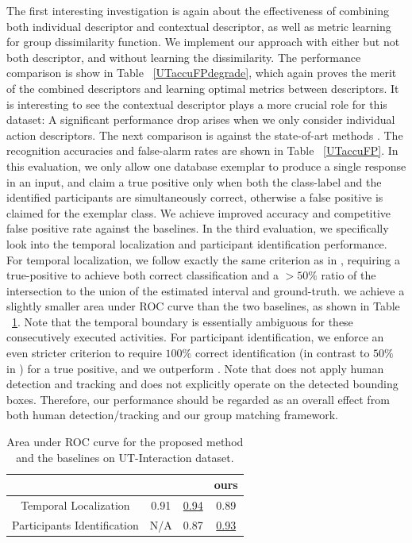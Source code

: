 \documentclass[10pt,twocolumn,letterpaper]{article}
\begin{document}
The first interesting investigation is again about the effectiveness of combining both individual descriptor and contextual descriptor, as well as metric learning for group dissimilarity function. We implement our approach with either but not both descriptor, and without learning the dissimilarity. The performance comparison is show in Table ~\ref{UTaccuFPdegrade}, which again proves the merit of the combined descriptors and learning optimal metrics between descriptors. It is interesting to see the contextual descriptor plays a more crucial role for this dataset: A significant performance drop arises when we only consider individual action descriptors. The next comparison is against the state-of-art methods \cite{Ryoo:group,Amer:group}. The recognition accuracies and false-alarm rates are shown in Table ~\ref{UTaccuFP}. In this evaluation, we only allow one database exemplar to produce a single response in an input, and claim a true positive only when both the class-label and the identified participants are simultaneously correct, otherwise a false positive is claimed for the exemplar class. We achieve improved accuracy and competitive false positive rate against the baselines. In the third evaluation, we specifically look into the temporal localization and participant identification performance. For temporal localization, we follow exactly the same criterion as in \cite{Amer:group}, requiring a true-positive to achieve both correct classification and a $>50\%$ ratio of the intersection to the union of the estimated interval and ground-truth. we achieve a slightly smaller area under ROC curve than the two baselines, as shown in Table ~\ref{UTarea}. Note that the temporal boundary is essentially ambiguous for these consecutively executed activities. For participant identification, we enforce an even stricter criterion to require $100\%$ correct identification (in contrast to $50\%$ in \cite{Amer:group}) for a true positive, and we outperform \cite{Amer:group}. Note that \cite{Ryoo:group} does not apply human detection and tracking and \cite{Amer:group} does not explicitly operate on the detected bounding boxes. Therefore, our performance should be regarded as an overall effect from both human detection/tracking and our group matching framework.

\begin{table}[ht]
\centering \caption{Area under ROC curve for the proposed method and the baselines on UT-Interaction dataset.}
\footnotesize{
\begin{tabular}{|c|c|c|c|}
\hline   & \cite{Ryoo:group} &  \cite{Amer:group}  &   ours \\
\hline Temporal Localization &  0.91 & \underline{0.94} &  0.89\\
\hline Participants Identification &  N/A & 0.87 &  \underline{0.93}   \\
\hline 
\end{tabular}
}
\label{UTarea}
\end{table}
\end{document}
